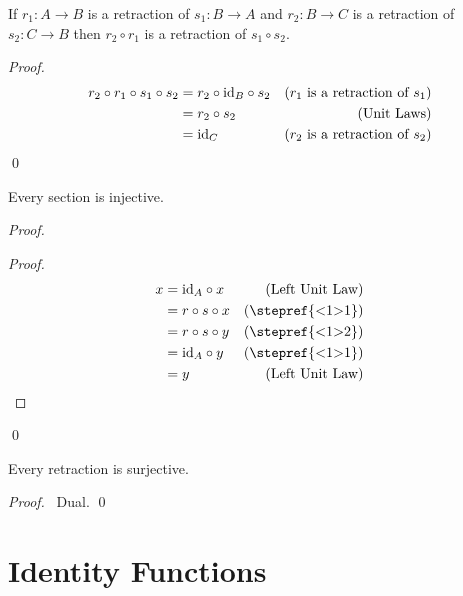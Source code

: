 \begin{prop}
\label{prop:sets:retraction:comp}
If $r_1 : A \rightarrow B$ is a retraction of $s_1 : B \rightarrow A$ and $r_2 : B \rightarrow C$ is a retraction of $s_2 : C \rightarrow B$ then $r_2 \circ r_1$ is a retraction of $s_1 \circ s_2$.
\end{prop}

\begin{proof}
\pf
\begin{align*}
r_2 \circ r_1 \circ s_1 \circ s_2 & = r_2 \circ \mathrm{id}_{B} \circ s_2 & (\text{$r_1$ is a retraction of $s_1$}) \\
& = r_2 \circ s_2 & (\text{Unit Laws}) \\
& = \mathrm{id}_{C} & (\text{$r_2$ is a retraction of $s_2$})
\end{align*}
\qed
\end{proof}

\begin{prop}
\label{prop:sets:section:injective}
Every section is injective.
\end{prop}

\begin{proof}
  \pf
  \begin{proof}
    \pf
    \begin{align*}
      x & = \id{A} \circ x & (\text{Left Unit Law}) \\
      & = r \circ s \circ x & (\text{\stepref{<1>1}}) \\
      & = r \circ s \circ y & (\text{\stepref{<1>2}}) \\
      & = \id{A} \circ y & (\text{\stepref{<1>1}}) \\
      & = y & (\text{Left Unit Law})
    \end{align*}
  \end{proof}
  \qed
\end{proof}

\begin{prop}
  \label{prop:sets:retraction:surjective}
  Every retraction is surjective.
\end{prop}

\begin{proof}
  \pf\ Dual. \qed
\end{proof}

\section{Identity Functions}

